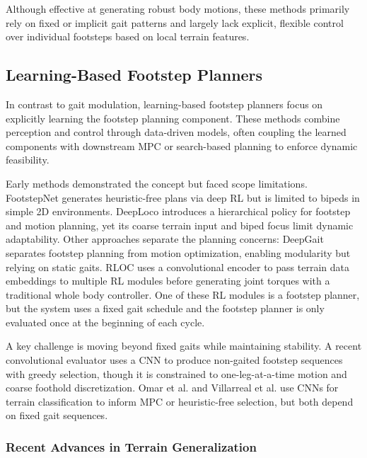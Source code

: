 Although effective at generating robust body motions, these methods
primarily rely on fixed or implicit gait patterns and largely lack
explicit, flexible control over individual footsteps based on local
terrain features.

\subsection{Learning-Based Footstep Planners}
\label{sec:hybrid-footstep-planners}

In contrast to gait modulation, learning-based footstep planners
focus on explicitly learning the footstep planning component. These
methods combine perception and control through data-driven models,
often coupling the learned components with downstream MPC or
search-based planning to enforce dynamic feasibility.

Early methods demonstrated the concept but faced scope limitations.
FootstepNet \cite{gaspard_footstepnet_2024} generates heuristic-free
plans via deep RL but is limited to bipeds in simple 2D environments.
DeepLoco \cite{peng_deeploco_2017} introduces a hierarchical policy
for footstep and motion planning, yet its coarse terrain input and
biped focus limit dynamic adaptability. Other approaches separate the
planning concerns: DeepGait \cite{tsounis_deepgait_2020} separates
footstep planning from motion optimization, enabling modularity but
relying on static gaits. RLOC \cite{gangapurwala_rloc_2022} uses
a convolutional encoder to pass terrain data embeddings to multiple
RL modules before generating joint torques with a traditional whole
body controller. One of these RL modules is a footstep planner,
but the system uses a fixed gait schedule and the footstep planner
is only evaluated once at the beginning of each cycle.

A key challenge is moving beyond fixed gaits while maintaining
stability. A recent convolutional evaluator \cite{bratta_contactnet_2024} uses a CNN to
produce non-gaited footstep sequences with greedy selection, though
it is constrained to one-leg-at-a-time motion and coarse foothold
discretization. Omar et al. \cite{omar_fast_2022} and Villarreal et
al. \cite{villarreal_fast_2019} use CNNs for terrain classification
to inform MPC or heuristic-free selection, but both depend on fixed
gait sequences.

\subsubsection{Recent Advances in Terrain Generalization}

